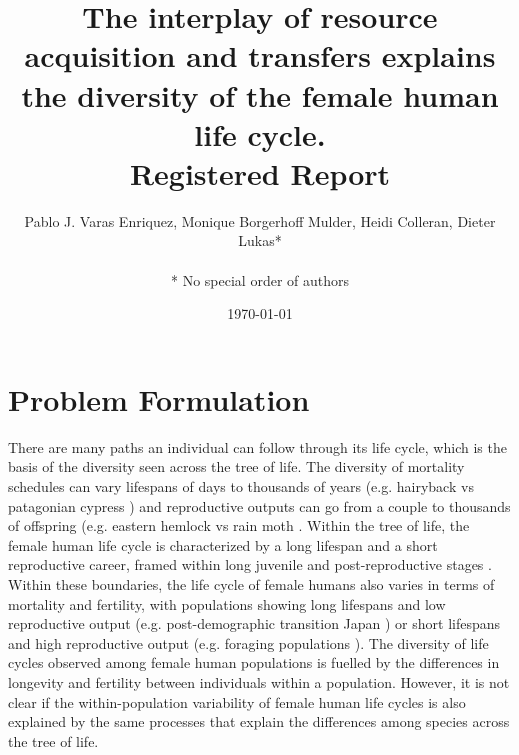\documentclass{article}
\title{The interplay of resource acquisition and transfers explains the diversity of the female human life cycle.
\\
Registered Report}
\author{Pablo J. Varas Enriquez, Monique Borgerhoff Mulder, Heidi Colleran, Dieter Lukas*\\\\
* No special order of authors}
\date{\today}
\begin{document}
\maketitle

\tableofcontents

\section{Problem Formulation}

There are many paths an individual can follow through its life cycle, which is the basis of the diversity seen across the tree of life. The diversity of mortality schedules can vary lifespans of days to thousands of years (e.g. hairyback vs patagonian cypress \citep{balsamo1988life,lara19933620}) and reproductive outputs can go from a couple to thousands of offspring (e.g. eastern hemlock vs rain moth \citep{tindale1932revision,van2017lifetime}. Within the tree of life, the female human life cycle is characterized by a long lifespan and a short reproductive career, framed within long juvenile and post-reproductive stages \citep{kaplan2000theory}. Within these boundaries, the life cycle of female humans also varies in terms of mortality and fertility, with populations showing long lifespans and low reproductive output (e.g. post-demographic transition Japan \citep{de2017maximum}) or short lifespans and high reproductive output (e.g. foraging populations \citep{migliano2007life}). The diversity of life cycles observed among female human populations is fuelled by the differences in longevity and fertility between individuals within a population. However, it is not clear if the within-population variability of female human life cycles is also explained by the same processes that explain the differences among species across the tree of life. 
\\\\
\end{document}
